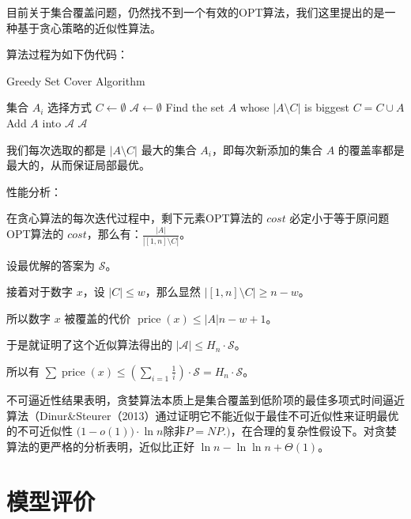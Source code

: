 \documentclass{cumcmthesis}
\begin{document}
目前关于集合覆盖问题，仍然找不到一个有效的OPT算法，我们这里提出的是一种基于贪心策略的近似性算法。

算法过程为如下伪代码：

\begin{algorithm}
    \caption{Greedy Set Cover Algorithm}
    \begin{algorithmic}[1]
        \Require 集合 $A_i$
        \Ensure 选择方式
        \State $C \gets \emptyset$
        \State $\mathscr{A} \gets \emptyset$
            \State Find the set $A$ whose $|A\setminus C|$ is biggest
            \State $C = C \cup A$
            \State Add $A$ into $\mathscr{A}$
        \EndWhile
        \State \Return $\mathscr{A}$
    \end{algorithmic}
\end{algorithm}

我们每次选取的都是 $|A\setminus C|$ 最大的集合 $A_i$，即每次新添加的集合 $A$ 的覆盖率都是最大的，从而保证局部最优。

性能分析：

在贪心算法的每次迭代过程中，剩下元素OPT算法的 $cost$ 必定小于等于原问题OPT算法的 $cost$，那么有：$\frac{|A|}{|[1,n]\setminus C|}$。

设最优解的答案为 $\mathscr{S}$。

接着对于数字 $x$，设 $|C| \le w$，那么显然 $|[1,n]\setminus C| \ge n - w$。

所以数字 $x$ 被覆盖的代价 $\operatorname{price}(x) \le {|A|}{n-w+1}$。

于是就证明了这个近似算法得出的 $|\mathscr{A}| \le H_n \cdot \mathscr{S}$。

所以有 $\sum \operatorname{price}(x) \le (\sum_{i=1}\frac{1}{i}) \cdot \mathscr{S} = H_n \cdot \mathscr{S}$。

不可逼近性结果表明，贪婪算法本质上是集合覆盖到低阶项的最佳多项式时间逼近算法（Dinur&Steurer（2013）通过证明它不能近似于最佳不可近似性来证明最优的不可近似性 ${\displaystyle {\bigl (}1-o(1){\bigr )}\cdot \ln {n}}\text{除非} P{\displaystyle =}NP.)$，在合理的复杂性假设下。对贪婪算法的更严格的分析表明，近似比正好 ${\displaystyle \ln {n}-\ln {\ln {n}}+\Theta(1)}$\cite{greedy-algorithm-for-set-cover}。


\section{模型评价}

\newpage


\newpage
\end{document}
